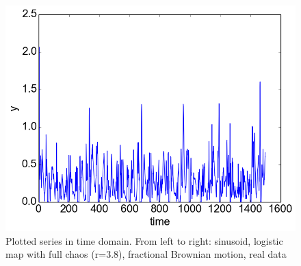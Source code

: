 \documentclass[12pt]{article}
\begin{document}
\begin{figure}
  \includegraphics[scale=0.4]{plot_vr}
  \caption{Plotted series in time domain. From left to right: sinusoid, logistic map with full chaos (r=3.8), fractional Brownian motion, real data}
  \label{fig:stack_ts_plots}
\end{figure}
\end{document}

